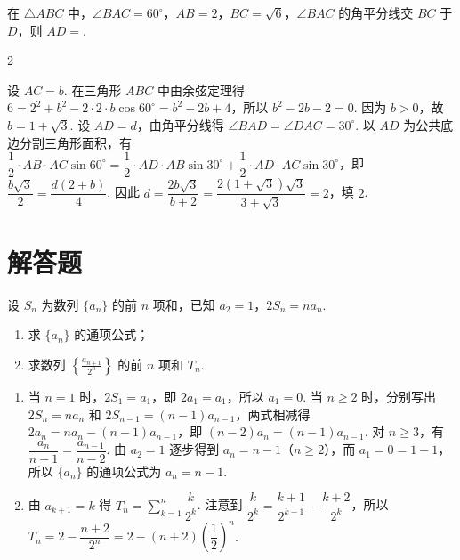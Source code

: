 \begin{problem}
在 \( \triangle ABC \) 中，\( \angle BAC=60^\circ \)，\( AB=2 \)，\( BC=\sqrt{6} \)，\( \angle BAC \) 的角平分线交 \(BC\) 于 \(D\)，则 \( AD= \)\fillinblank{}.
\end{problem}

\begin{answer}
2
\end{answer}

\begin{solution}
设 \(AC=b\). 在三角形 \(ABC\) 中由余弦定理得
\(6=2^2+b^2-2\cdot2\cdot b\cos60^\circ=b^2-2b+4\)，所以 \(b^2-2b-2=0\). 因为 \(b>0\)，故 \(b=1+\sqrt3\). 设 \(AD=d\)，由角平分线得 \(\angle BAD=\angle DAC=30^\circ\). 以 \(AD\) 为公共底边分割三角形面积，有
\(\dfrac12\cdot AB\cdot AC\sin60^\circ=\dfrac12\cdot AD\cdot AB\sin30^\circ+\dfrac12\cdot AD\cdot AC\sin30^\circ\)，即
\(\dfrac{b\sqrt3}{2}=\dfrac{d(2+b)}{4}\). 因此
\(d=\dfrac{2b\sqrt3}{b+2}=\dfrac{2(1+\sqrt3)\sqrt3}{3+\sqrt3}=2\)，填 \(2\).
\end{solution}

\section{解答题}

\begin{problem}
设 \( S_n \) 为数列 \( \{a_n\} \) 的前 \( n \) 项和，已知 \( a_2=1 \)，\( 2S_n=na_n \).

\begin{enumerate}
\item 求 \( \{a_n\} \) 的通项公式；
\item 求数列 \( \left\{ \frac{a_{n+1}}{2^n} \right\} \) 的前 \( n \) 项和 \( T_n \).
\end{enumerate}
\end{problem}

\begin{solution}
\begin{enumerate}
\item 当 \(n=1\) 时，\(2S_1=a_1\)，即 \(2a_1=a_1\)，所以 \(a_1=0\). 当 \(n\geq2\) 时，分别写出
\(2S_n=na_n\) 和 \(2S_{n-1}=(n-1)a_{n-1}\)，两式相减得
\(2a_n=na_n-(n-1)a_{n-1}\)，即 \((n-2)a_n=(n-1)a_{n-1}\). 对 \(n\geq3\)，有
\(\dfrac{a_n}{n-1}=\dfrac{a_{n-1}}{n-2}\). 由 \(a_2=1\) 逐步得到 \(a_n=n-1\)（\(n\geq2\)），而 \(a_1=0=1-1\)，所以 \(\{a_n\}\) 的通项公式为 \(a_n=n-1\).
\item 由 \(a_{k+1}=k\) 得
\(T_n=\displaystyle\sum_{k=1}^n\dfrac{k}{2^k}\). 注意到
\(\dfrac{k}{2^k}=\dfrac{k+1}{2^{k-1}}-\dfrac{k+2}{2^k}\)，所以
\(T_n=2-\dfrac{n+2}{2^n}=2-(n+2)\left(\dfrac12\right)^n\).
\end{enumerate}
\end{solution}

